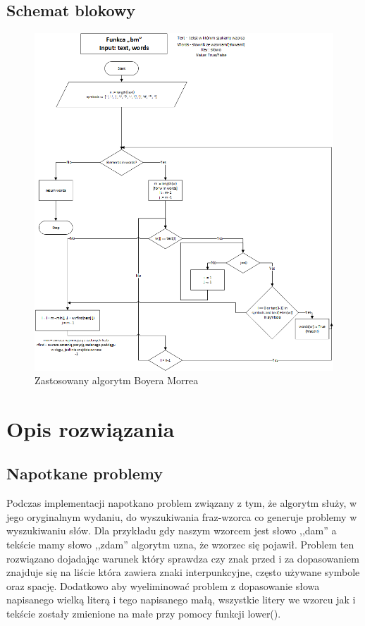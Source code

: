 \documentclass[12pt,a4paper]{article}
\begin{document}
\subsection{Schemat blokowy}
\begin{figure}[h]
\centering
\includegraphics[scale=0.6]{boyermorre_flow.png}
\caption{Zastosowany algorytm Boyera Morrea}
\label{fig:boyer morre}
\end{figure}

\section{Opis rozwiązania}

\subsection{Napotkane problemy}
Podczas implementacji napotkano problem związany z tym, że algorytm służy, w jego oryginalnym wydaniu, do wyszukiwania fraz-wzorca co generuje problemy w wyszukiwaniu słów. Dla przykładu gdy naszym wzorcem jest słowo ,,dam'' a tekście mamy słowo ,,zdam'' algorytm uzna, że wzorzec się pojawił. Problem ten rozwiązano dojadając warunek który sprawdza czy znak przed i za dopasowaniem znajduje się na liście która zawiera znaki interpunkcyjne, często używane symbole oraz spację. Dodatkowo aby wyeliminować problem z dopasowanie słowa napisanego wielką literą i tego napisanego małą, wszystkie litery we wzorcu jak i tekście zostały zmienione na małe przy pomocy funkcji lower(). 
\end{document}
